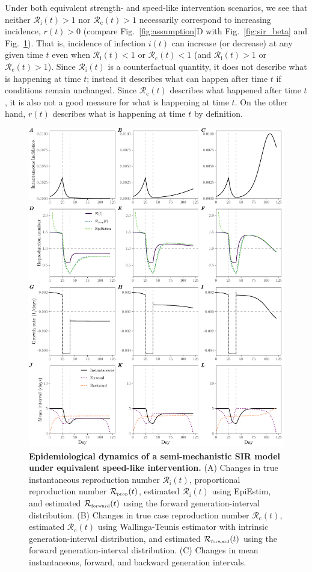 \documentclass[12pt]{article}
\newcommand{\fref}[1]{Fig.~\ref{fig:#1}}
\newcommand{\Rx}[1]{\ensuremath{{\mathcal R}_{#1}}\xspace}
\newcommand{\Rc}{\Rx{\mathrm{c}}}
\newcommand{\Ri}{\Rx{\mathrm{i}}}
\newcommand{\RR}{\ensuremath{{\mathcal R}}\xspace}
\newcommand{\tsub}[2]{#1_{{\textrm{\tiny #2}}}}
\begin{document}
Under both equivalent strength- and speed-like intervention scenarios, we see that neither $\Ri(t) > 1$ nor $\Rc(t) > 1$ necessarily correspond to increasing incidence, $r(t) > 0$ (compare \fref{assumption}D with \fref{sir_beta} and \fref{sir_semi}).
That is, incidence of infection $i(t)$ can increase (or decrease) at any given time $t$ even when $\Ri(t) < 1$ or $\Rc(t) < 1$ (and $\Ri(t) > 1$ or $\Rc(t) > 1$).
Since $\Ri(t)$ is a counterfactual quantity, it does not describe what is happening at time $t$; instead it describes what can happen after time $t$ if conditions remain unchanged.
Since $\Rc(t)$ describes what happened after time $t$, it is also not a good measure for what is happening at time $t$.
On the other hand, $r(t)$ describes what is happening at time $t$ by definition.

\begin{figure}
\includegraphics[width=\textwidth]{figure_sir_semi.pdf}
\caption{
\textbf{Epidemiological dynamics of a semi-mechanistic SIR model under equivalent speed-like intervention.}
(A) Changes in true instantaneous reproduction number $\Ri(t)$, proportional reproduction number $\tsub{\RR}{prop}(t)$, estimated $\Ri(t)$ using EpiEstim, and estimated $\tsub{\RR}{forward}(t)$ using the forward generation-interval distribution.
(B) Changes in true case reproduction number $\Rc(t)$, estimated $\Rc(t)$ using Wallinga-Teunis estimator with intrinsic generation-interval distribution, and estimated $\tsub{\RR}{forward}(t)$ using the forward generation-interval distribution.
(C) Changes in mean instantaneous, forward, and backward generation intervals.
}
\label{fig:sir_semi}
\end{figure}
\end{document}
